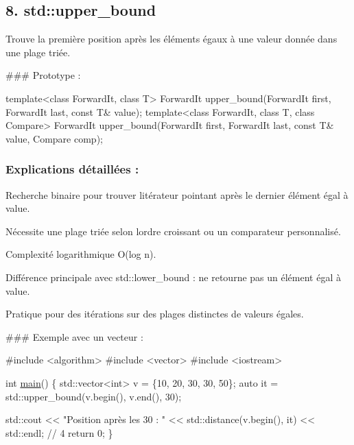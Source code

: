 \subsection*{8. {\bfseries std\+::upper\+\_\+bound}}

Trouve la première position après les éléments égaux à une valeur donnée dans une plage triée.

\#\#\# Prototype \+: 
\begin{DoxyCode}
\textcolor{keyword}{template}<\textcolor{keyword}{class} ForwardIt, \textcolor{keyword}{class} T>
ForwardIt upper\_bound(ForwardIt first, ForwardIt last, \textcolor{keyword}{const} T& value);
\textcolor{keyword}{template}<\textcolor{keyword}{class} ForwardIt, \textcolor{keyword}{class} T, \textcolor{keyword}{class} Compare>
ForwardIt upper\_bound(ForwardIt first, ForwardIt last, \textcolor{keyword}{const} T& value, Compare comp);
\end{DoxyCode}


\subsubsection*{Explications détaillées \+:}


\begin{DoxyItemize}
\item Recherche binaire pour trouver l\textquotesingle{}itérateur pointant après le dernier élément égal à {\ttfamily value}.
\item Nécessite une plage triée selon l\textquotesingle{}ordre croissant ou un comparateur personnalisé.
\item Complexité logarithmique O(log n).
\item Différence principale avec {\ttfamily std\+::lower\+\_\+bound} \+: ne retourne pas un élément égal à {\ttfamily value}.
\item Pratique pour des itérations sur des plages distinctes de valeurs égales.
\end{DoxyItemize}

\#\#\# Exemple avec un vecteur \+: 
\begin{DoxyCode}
\textcolor{preprocessor}{#include <algorithm>}
\textcolor{preprocessor}{#include <vector>}
\textcolor{preprocessor}{#include <iostream>}

\textcolor{keywordtype}{int} \hyperlink{htop_8c_a3c04138a5bfe5d72780bb7e82a18e627}{main}() \{
    std::vector<int> v = \{10, 20, 30, 30, 50\};
    \textcolor{keyword}{auto} it = std::upper\_bound(v.begin(), v.end(), 30);

    std::cout << \textcolor{stringliteral}{"Position après les 30 : "} << std::distance(v.begin(), it) << std::endl; \textcolor{comment}{// 4}
    \textcolor{keywordflow}{return} 0;
\}
\end{DoxyCode}
 



